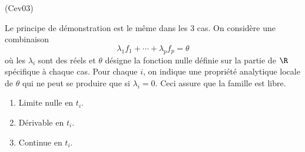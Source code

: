 \begin{tiny}(Cev03)\end{tiny} Le principe de démonstration est le même dans les 3 cas. On considère une combinaison 
\[
  \lambda_1 f_1 + \cdots + \lambda_p f_p = \theta
\]
où les $\lambda_i$ sont des réels et $\theta$ désigne la fonction nulle définie sur la partie de $\R$ spécifique à chaque cas. Pour chaque $i$, on indique une propriété analytique locale de $\theta$ qui ne peut se produire que si $\lambda_i = 0$. Ceci assure que la famille est libre.
\begin{enumerate}
  \item Limite nulle en $t_i$.
  \item Dérivable en $t_i$.
  \item Continue en $t_i$.
\end{enumerate}
